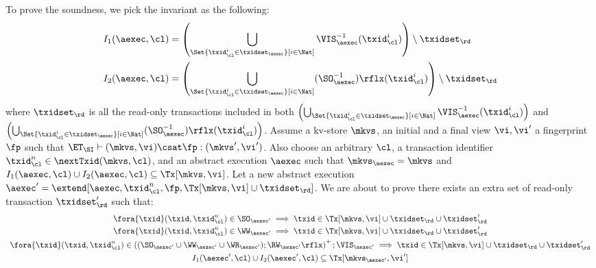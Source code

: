 To prove the soundness, we pick the invariant as the following:
\begin{align*}
    I_1(\aexec, \cl) & = \left( \bigcup_{\Set{\txid_{\cl}^{i} \in \txidset_{\aexec} }[ i \in \Nat ]} \VIS_{\aexec}^{-1}(\txid^i_\cl) \right) \setminus \txidset_\rd \\
    I_2(\aexec, \cl) & = \left( \bigcup_{\Set{\txid_{\cl}^{i} \in \txidset_{\aexec} }[ i \in \Nat ]} (\SO_{\aexec}^{-1})\rflx(\txid^i_\cl) \right) \setminus \txidset_\rd
\end{align*}
where \( \txidset_\rd \) is all the read-only transactions included in both 
\( \left( \bigcup_{\Set{\txid_{\cl}^{i} \in \txidset_{\aexec} }[ i \in \Nat ]} \VIS_{\aexec}^{-1}(\txid^i_\cl) \right)\) 
and \( \left( \bigcup_{\Set{\txid_{\cl}^{i} \in \txidset_{\aexec} }[ i \in \Nat ]} (\SO_{\aexec}^{-1})\rflx(\txid^i_\cl) \right) \).
Assume a kv-store $\mkvs$, an initial and a final view $\vi, \vi'$  a fingerprint $\fp$ 
such that $\ET_{\SI} \vdash (\mkvs, \vi) \csat \fp: (\mkvs',\vi')$. 
Also choose an arbitrary $\cl$, a transaction identifier $\txid_\cl^n \in \nextTxid(\mkvs, \cl)$, 
and an abstract execution $\aexec$ such that $\mkvs_{\aexec} = \mkvs$ and 
\( I_1(\aexec, \cl) \cup I_2(\aexec, \cl) \subseteq \Tx[\mkvs, \vi] \).
Let a new abstract execution \( \aexec' = \extend[\aexec, \txid_\cl^n, \fp, \Tx[\mkvs, \vi] \cup \txidset_\rd]\).
We are about to prove there exists an extra set of read-only transaction \( \txidset'_\rd \) such that:
\begin{gather}
    \fora{\txid} (\txid, \txid_\cl^n) \in \SO_{\aexec'} \implies \txid \in \Tx[\mkvs, \vi] \cup \txidset_\rd \cup \txidset'_\rd \label{equ:si-sound-update-so}\\
    \fora{\txid} (\txid, \txid_\cl^n) \in \WW_{\aexec'} \implies \txid \in \Tx[\mkvs, \vi] \cup \txidset_\rd \cup \txidset'_\rd \label{equ:si-sound-update-ww}\\
    \begin{array}{l}
    \fora{\txid} (\txid, \txid_\cl^n) \in \left( (\SO_{\aexec'} \cup \WW_{\aexec'} \cup \WR_{\aexec'} ) ; \RW_{\aexec'}\rflx \right)^+ ; \VIS_{\aexec'} 
    \implies \txid \in \Tx[\mkvs, \vi] \cup \txidset_\rd \cup \txidset'_\rd 
    \end{array}
    \label{equ:si-sound-update-arvis}\\
    I_1(\aexec',\cl) \cup I_2(\aexec',\cl) \subseteq \Tx[\mkvs_{\aexec'}, \vi'] \label{equ:si-sound-inv} 
\end{gather}
